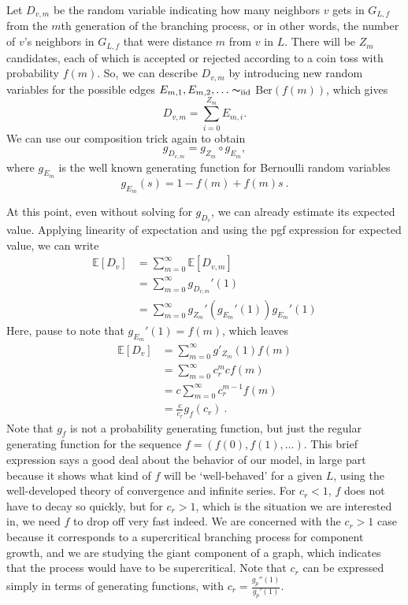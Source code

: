 \documentclass[12pt]{article}
\newcommand{\iid}{\mathrm{iid}}
\newcommand{\E}{\mathbb{E}}
\begin{document}
Let $D_{v,m}$ be the random variable indicating how many neighbors $v$ gets
in $G_{L,f}$ from the $m$th generation of the branching process, or in other
words, the number of $v$'s neighbors in $G_{L,f}$ that were distance $m$ from
$v$ in $L$. There will be $Z_m$ candidates, each of which is accepted
or rejected according to a coin toss with probability $f(m)$. So, we
can describe $D_{v,m}$ by introducing new random variables for the
possible edges $E_{m,1}, E_{m,2},\dotsc \thicksim_\iid$ Ber$(f(m))$, which
gives \[ D_{v,m} = \sum_{i=0}^{Z_m} E_{m,i}.\] We can use our composition
trick again to obtain \[ g_{D_{v,m}} = g_{Z_m} \circ g_{E_{m}}, \]
where $g_{E_m}$ is the well known generating function for Bernoulli
random variables \[ g_{E_m}(s) = 1 - f(m) + f(m) s\ . \]\par

At this point, even without solving for $g_{D_v}$, we can already
estimate its expected value. Applying linearity of expectation and using
the pgf expression for expected value, we can write
\begin{align*}
\E[D_v] &= \sum_{m=0}^\infty \E[D_{v,m}] \\
        &= \sum_{m=0}^\infty g_{D_{v,m}}'(1) \\
        &= \sum_{m=0}^\infty g_{Z_m}'(g_{E_m}'(1))g_{E_m}'(1)
\end{align*}
Here, pause to note that $g_{E_m}'(1) = f(m)$, which leaves
\begin{align*}
\E[D_v] &= \sum_{m=0}^\infty g'_{Z_m}(1) f(m) \\
        &= \sum_{m=0}^\infty c_r^m c f(m) \\
        &= c \sum_{m=0}^\infty c_r^{m-1} f(m) \\
        &= \frac{c}{c_r} g_f(c_r)\ .
\end{align*}
Note that $g_f$ is not a probability generating function, but just the
regular generating function for the sequence $f=(f(0),f(1),\dotsc)$.
This brief expression says a good deal about the behavior of our model,
in large part because it shows what kind of $f$ will be `well-behaved'
for a given $L$, using the well-developed theory of convergence and
infinite series. For $c_r<1$, $f$ does not have to decay so quickly,
but for $c_r > 1$, which is the situation we are interested in,
we need $f$ to drop off very fast indeed. We are concerned with the
$c_r > 1$ case because it corresponds to a supercritical branching process
for component growth, and we are studying the giant component of a graph,
which indicates that the process would have to be supercritical.
Note that $c_r$ can be expressed simply in terms of generating functions,
with $c_r = \frac{g_p''(1)}{g_p'(1)}$.\par
\end{document}
